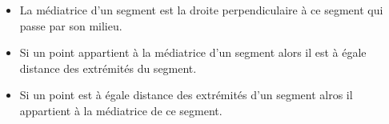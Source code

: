 \exo{}

\begin{itemize}[itemsep=1em]
	\item La médiatrice d'un segment est la droite perpendiculaire à ce segment qui passe par son milieu.
	\item Si un point appartient à la médiatrice d'un segment alors il est à égale distance des extrémités du segment.
	\item Si un point est à égale distance des extrémités d'un segment alros il appartient à la médiatrice de ce segment.
\end{itemize}